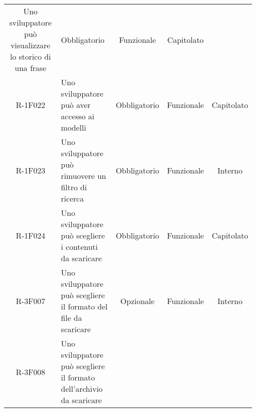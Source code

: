 \begin{tabularx}{\textwidth}{cXccc}
Uno sviluppatore può visualizzare lo storico di una frase &

Obbligatorio &

Funzionale &

Capitolato \\
R-1F022 &

Uno sviluppatore può aver accesso ai modelli &

Obbligatorio &

Funzionale &

Capitolato \\
R-1F023 &

Uno sviluppatore può rimuovere un filtro di ricerca &

Obbligatorio &

Funzionale &

Interno \\
R-1F024 &

Uno sviluppatore può scegliere i contenuti da scaricare &

Obbligatorio &

Funzionale &

Capitolato \\
R-3F007 &

Uno sviluppatore può scegliere il formato del file da scaricare &

Opzionale &

Funzionale &

Interno \\
R-3F008 &

Uno sviluppatore può scegliere il formato dell’archivio da scaricare &


\end{tabularx}
